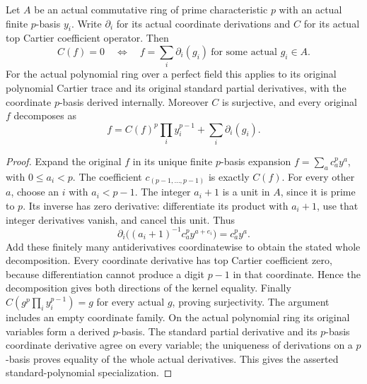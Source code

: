 \begin{lemma}
\label{lem:vanishing-cartier-top-exactness}
\leanok
Let $A$ be an actual commutative ring of prime characteristic $p$ with an
actual finite $p$-basis $y_i$. Write $\partial_i$ for its actual coordinate
derivations and $C$ for its actual top Cartier coefficient operator. Then
\[
 C(f)=0\quad\Longleftrightarrow\quad
 f=\sum_i\partial_i(g_i)\ \text{for some actual }g_i\in A.
\]
For the actual polynomial ring over a perfect field this applies to its
original polynomial Cartier trace and its original standard partial
derivatives, with the coordinate $p$-basis derived internally.
Moreover $C$ is surjective, and every original $f$ decomposes as
\[
 f=C(f)^p\prod_i y_i^{p-1}+\sum_i\partial_i(g_i).
\]
\end{lemma}
\begin{proof}
Expand the original $f$ in its unique finite $p$-basis expansion
$f=\sum_a c_a^py^a$, with $0\le a_i<p$. The coefficient $c_{(p-1,\ldots,p-1)}$
is exactly $C(f)$. For every other $a$, choose an $i$ with $a_i<p-1$.
The integer $a_i+1$ is a unit in $A$, since it is prime to $p$. Its inverse
has zero derivative: differentiate its product with $a_i+1$, use that
integer derivatives vanish, and cancel this unit. Thus
\[
 \partial_i\bigl((a_i+1)^{-1}c_a^py^{a+e_i}\bigr)=c_a^py^a.
\]
Add these finitely many antiderivatives coordinatewise to obtain the
stated whole decomposition. Every coordinate derivative has top Cartier
coefficient zero, because differentiation cannot produce a digit $p-1$
in that coordinate. Hence the decomposition gives both directions of
the kernel equality. Finally
$C(g^p\prod_i y_i^{p-1})=g$ for every actual $g$, proving surjectivity.
The argument includes an empty coordinate family. On the actual
polynomial ring its original variables form a derived $p$-basis. The
standard partial derivative and its $p$-basis coordinate derivative agree
on every variable; the uniqueness of derivations on a $p$-basis proves
equality of the whole actual derivatives. This gives the asserted
standard-polynomial specialization.
\end{proof}

